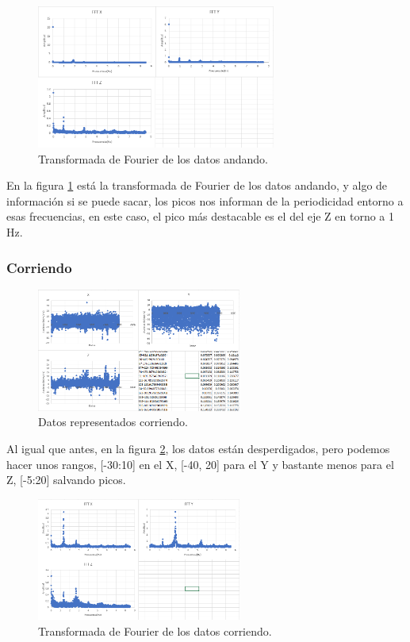 \documentclass[12pt]{article}
\numberwithin{equation}{section}
\begin{document}
\begin{figure}[h]
    \centering
    \includegraphics[width=0.7\textwidth]{andandofft.png}
    \caption{Transformada de Fourier de los datos andando.}
    \label{fig:andandofft}
\end{figure}

En la figura \ref{fig:andandofft} está la transformada de Fourier de los datos andando, y algo de información si se puede sacar, los picos nos informan de la periodicidad entorno a esas frecuencias, en este caso, el pico más destacable es el del eje Z en torno a 1 Hz.

\subsubsection{Corriendo}
\begin{figure}[h]
    \centering
    \includegraphics[width=0.6\textwidth]{corriendoraw.png}
    \caption{Datos representados corriendo.}
    \label{fig:corriendoraw}
\end{figure}

Al igual que antes, en la figura \ref{fig:corriendoraw}, los datos están desperdigados, pero podemos hacer unos rangos, [-30:10] en el X, [-40, 20] para el Y y bastante menos para el Z, [-5:20] salvando picos.
\begin{figure}[h]
    \centering
    \includegraphics[width=0.6\textwidth]{corriendofft.png}
    \caption{Transformada de Fourier de los datos corriendo.}
    \label{fig:corriendofft}
\end{figure}
\end{document}
